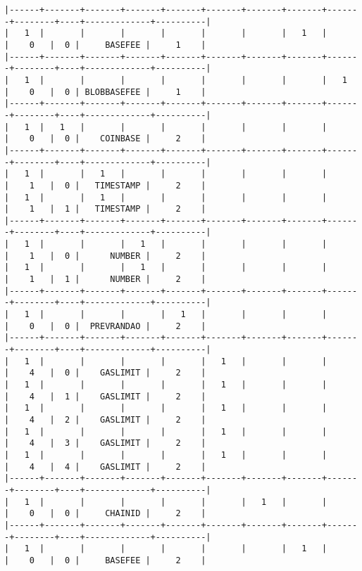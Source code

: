 \documentclass[varwidth=\maxdimen,margin=0.5cm,multi={verbatim}]{standalone}
\begin{document}
\begin{verbatim}
|------+-------+-------+-------+-------+-------+-------+-------+-------+--------+----+-------------+----------|
|   1  |       |       |       |       |       |       |   1   |       |    0   |  0 |     BASEFEE |     1    |
|------+-------+-------+-------+-------+-------+-------+-------+-------+--------+----+-------------+----------|
|   1  |       |       |       |       |       |       |       |   1   |    0   |  0 | BLOBBASEFEE |     1    |
|------+-------+-------+-------+-------+-------+-------+-------+-------+--------+----+-------------+----------|
|   1  |   1   |       |       |       |       |       |       |       |    0   |  0 |    COINBASE |     2    |
|------+-------+-------+-------+-------+-------+-------+-------+-------+--------+----+-------------+----------|
|   1  |       |   1   |       |       |       |       |       |       |    1   |  0 |   TIMESTAMP |     2    |
|   1  |       |   1   |       |       |       |       |       |       |    1   |  1 |   TIMESTAMP |     2    |
|------+-------+-------+-------+-------+-------+-------+-------+-------+--------+----+-------------+----------|
|   1  |       |       |   1   |       |       |       |       |       |    1   |  0 |      NUMBER |     2    |
|   1  |       |       |   1   |       |       |       |       |       |    1   |  1 |      NUMBER |     2    |
|------+-------+-------+-------+-------+-------+-------+-------+-------+--------+----+-------------+----------|
|   1  |       |       |       |   1   |       |       |       |       |    0   |  0 |  PREVRANDAO |     2    |
|------+-------+-------+-------+-------+-------+-------+-------+-------+--------+----+-------------+----------|
|   1  |       |       |       |       |   1   |       |       |       |    4   |  0 |    GASLIMIT |     2    |
|   1  |       |       |       |       |   1   |       |       |       |    4   |  1 |    GASLIMIT |     2    |
|   1  |       |       |       |       |   1   |       |       |       |    4   |  2 |    GASLIMIT |     2    |
|   1  |       |       |       |       |   1   |       |       |       |    4   |  3 |    GASLIMIT |     2    |
|   1  |       |       |       |       |   1   |       |       |       |    4   |  4 |    GASLIMIT |     2    |
|------+-------+-------+-------+-------+-------+-------+-------+-------+--------+----+-------------+----------|
|   1  |       |       |       |       |       |   1   |       |       |    0   |  0 |     CHAINID |     2    |
|------+-------+-------+-------+-------+-------+-------+-------+-------+--------+----+-------------+----------|
|   1  |       |       |       |       |       |       |   1   |       |    0   |  0 |     BASEFEE |     2    |

\end{verbatim}
\end{document}
